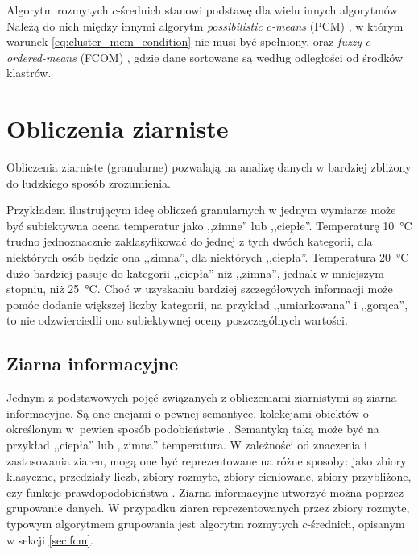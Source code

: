 \documentclass[a4paper,twoside,12pt]{book}
\newcommand{\obcy}[1]{\emph{#1}}
\newcommand{\english}[1]{{\selectlanguage{british}\obcy{#1}}}
\begin{document}
Algorytm rozmytych $c$-średnich stanowi podstawę dla wielu innych algorytmów. Należą do nich między innymi algorytm \english{possibilistic $c$-means} (PCM) \cite{bib:pcm-algorithm}, w którym warunek \eqref{eq:cluster_mem_condition} nie musi być spełniony, oraz \english{fuzzy $c$-ordered-means} (FCOM) \cite{bib:fcom-algorithm}, gdzie dane sortowane są według odległości od środków klastrów.

\chapter{Obliczenia ziarniste}
\label{sec:analiza-tematu-ziarna}

Obliczenia ziarniste (granularne) pozwalają na analizę danych w bardziej zbliżony do ludzkiego sposób zrozumienia. 

Przykładem ilustrującym ideę obliczeń granularnych w jednym wymiarze może być subiektywna ocena temperatur jako ,,zimne'' lub ,,ciepłe''. Temperaturę \SI{10}{\celsius} trudno jednoznacznie zaklasyfikować do jednej z tych dwóch kategorii, dla niektórych osób będzie ona ,,zimna'', dla niektórych ,,ciepła''. Temperatura \SI{20}{\celsius} dużo bardziej pasuje do kategorii ,,ciepła'' niż ,,zimna'', jednak w mniejszym stopniu, niż \SI{25}{\celsius}. Choć w uzyskaniu bardziej szczegółowych informacji może pomóc dodanie większej liczby kategorii, na przykład ,,umiarkowana'' i ,,gorąca'', to nie odzwierciedli ono subiektywnej oceny poszczególnych wartości.

\section{Ziarna informacyjne}

Jednym z podstawowych pojęć związanych z obliczeniami ziarnistymi są ziarna informacyjne. 
Są one encjami o pewnej semantyce, kolekcjami obiektów o określonym w~pewien sposób podobieństwie \cite{bib:general-framework-information-granules,bib:designing-higher-order-information-granules}. Semantyką taką może być na przykład ,,ciepła'' lub ,,zimna'' temperatura.
%
W zależności od znaczenia i zastosowania ziaren, mogą one być reprezentowane na różne sposoby: jako zbiory klasyczne, przedziały liczb, zbiory rozmyte, zbiory cieniowane, zbiory przybliżone, czy funkcje prawdopodobieństwa \cite{bib:general-framework-information-granules}.
%
Ziarna informacyjne utworzyć można poprzez grupowanie danych. W przypadku ziaren reprezentowanych przez zbiory rozmyte, typowym algorytmem grupowania jest algorytm rozmytych $c$-średnich, opisanym w sekcji \ref{sec:fcm}.
\end{document}
